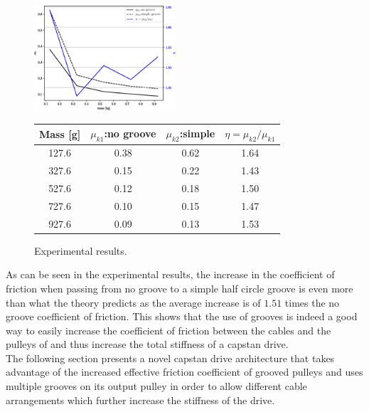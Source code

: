 \documentclass[10pt,cleanfoot]{asme2ej}
\begin{document}
\begin{figure}
\centering
\includegraphics[width=0.47\textwidth]{fig_exp.eps}
\qquad
\begin{tabular}[b]{cccc}\hline
      Mass [g] & $\mu_{k1}$:no groove & $\mu_{k2}$:simple & $\eta=\mu_{k2}/\mu_{k1}$\\ \hline
      127.6 & 0.38 & 0.62 & 1.64\\
      327.6 & 0.15 & 0.22 & 1.43\\
      527.6 & 0.12 & 0.18 & 1.50\\
      727.6 & 0.10 & 0.15 & 1.47\\
      927.6 & 0.09 & 0.13 & 1.53\\ \hline
      
    \end{tabular}
    \label{tab:exp_tab}
    \captionsetup{labelformat=andtable}
    \caption{Experimental results.}
\end{figure}
\par
As can be seen in the experimental results, the increase in the coefficient of friction when passing from no groove to a simple half circle groove is even more than what the theory predicts as the average increase is of $1.51$ times the no groove coefficient of friction. This shows that the use of grooves is indeed a good way to easily increase the coefficient of friction between the cables and the pulleys of and thus increase the total stiffness of a capstan drive.
\\ 
 The following section presents a novel capstan drive architecture that takes advantage of the increased effective friction coefficient of grooved pulleys and uses multiple grooves on its output pulley in order to allow different cable arrangements which further increase the stiffness of the drive.
\end{document}
